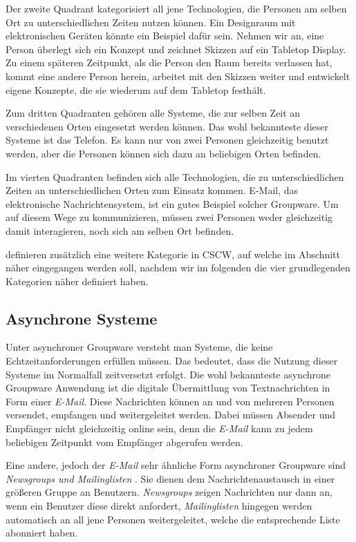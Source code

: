 Der zweite Quadrant kategorisiert all jene Technologien, die Personen am selben Ort zu unterschiedlichen Zeiten nutzen können. Ein Designraum mit elektronischen Geräten könnte ein Beispiel dafür sein. Nehmen wir an, eine Person überlegt sich ein Konzept und zeichnet Skizzen auf ein Tabletop Display. Zu einem späteren Zeitpunkt, als die Person den Raum bereits verlassen hat, kommt eine andere Person herein, arbeitet mit den Skizzen weiter und entwickelt eigene Konzepte, die sie wiederum auf dem Tabletop festhält. 

Zum dritten Quadranten gehören alle Systeme, die zur selben Zeit an verschiedenen Orten eingesetzt werden können. Das wohl bekannteste dieser Systeme ist das Telefon. Es kann nur von zwei Personen gleichzeitig benutzt werden, aber die Personen können sich dazu an beliebigen Orten befinden.

Im vierten Quadranten befinden sich alle Technologien, die zu unterschiedlichen Zeiten an unterschiedlichen Orten zum Einsatz kommen. E-Mail, das elektronische Nachrichtensystem, ist ein gutes Beispiel solcher Groupware. Um auf diesem Wege zu kommunizieren, müssen zwei Personen weder gleichzeitig damit interagieren, noch sich am selben Ort befinden. 

\medskip\citeauthor{Gerlicher:2007p241} definieren zusätzlich eine weitere Kategorie in CSCW, auf welche im Abschnitt  näher eingegangen werden soll, nachdem wir im folgenden die vier grundlegenden Kategorien näher definiert haben.

\subsection{Asynchrone Systeme}

Unter asynchroner Groupware versteht man Systeme, die keine Echtzeitanforderungen erfüllen müssen. Das bedeutet, dass die Nutzung dieser Systeme im Normalfall zeitversetzt erfolgt. Die wohl bekannteste asynchrone Groupware Anwendung ist die digitale Übermittlung von Textnachrichten in Form einer \emph{E-Mail}. Diese Nachrichten können an und von mehreren Personen versendet, empfangen und weitergeleitet werden. Dabei müssen Absender und Empfänger nicht gleichzeitig online sein, denn die \emph{E-Mail} kann zu jedem beliebigen Zeitpunkt vom Empfänger abgerufen werden.

Eine andere, jedoch der \emph{E-Mail} sehr ähnliche Form asynchroner Groupware sind \emph{Newsgroups und Mailinglisten} \citep{Gerlicher:2007p241}. Sie dienen dem Nachrichtenaustausch in einer größeren Gruppe an Benutzern. \emph{Newsgroups} zeigen Nachrichten nur dann an, wenn ein Benutzer diese direkt anfordert, \emph{Mailinglisten} hingegen werden automatisch an all jene Personen weitergeleitet, welche die entsprechende Liste abonniert haben.

